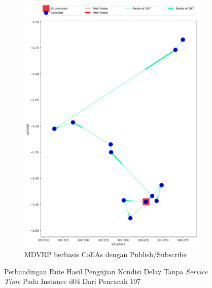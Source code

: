 \begin{figure}[H]\ContinuedFloat
	\centering
	\begin{subfigure}[t]{\textwidth}
		\centering
		\includegraphics[width=\textwidth]{Resources/Images/delayed_5/real_m15_n100_delayed_5_197_pubsub_coes}
		\caption{MDVRP berbasis CoEAs dengan Publish/Subscribe}
		\label{fig:real_m15_n100_delayed_5_197_pubsub_coes}
	\end{subfigure}
	\caption{Perbandingan Rute Hasil Pengujian Kondisi Delay Tanpa \textit{Service Time} Pada Instance d04 Dari Pencacah 197}
	\label{fig:real_m15_n100_delayed_5_197_contd}
\end{figure}


